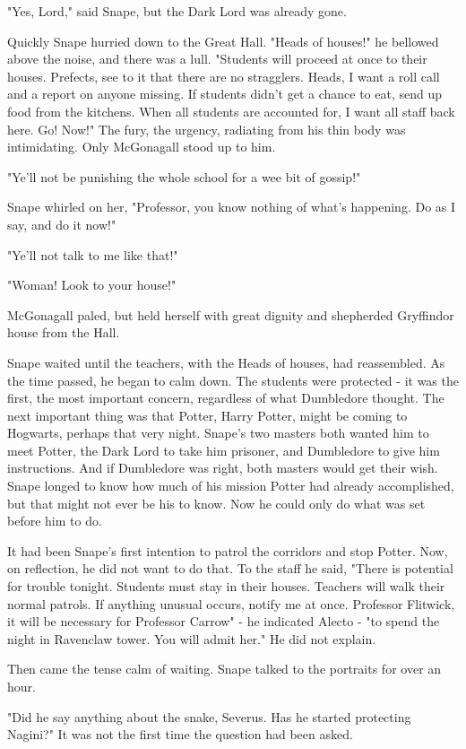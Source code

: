 "Yes, Lord," said Snape, but the Dark Lord was already gone.

Quickly Snape hurried down to the Great Hall. "Heads of houses!" he bellowed above the noise, and there was a lull. "Students will proceed at once to their houses. Prefects, see to it that there are no stragglers. Heads, I want a roll call and a report on anyone missing. If students didn't get a chance to eat, send up food from the kitchens. When all students are accounted for, I want all staff back here. Go! Now!" The fury, the urgency, radiating from his thin body was intimidating. Only McGonagall stood up to him.

"Ye'll not be punishing the whole school for a wee bit of gossip!"

Snape whirled on her, "Professor, you know nothing of what's happening. Do as I say, and do it now!"

"Ye'll not talk to me like that!"

"Woman! Look to your house!"

McGonagall paled, but held herself with great dignity and shepherded Gryffindor house from the Hall.

Snape waited until the teachers, with the Heads of houses, had reassembled. As the time passed, he began to calm down. The students were protected - it was the first, the most important concern, regardless of what Dumbledore thought. The next important thing was that Potter, Harry Potter, might be coming to Hogwarts, perhaps that very night. Snape's two masters both wanted him to meet Potter, the Dark Lord to take him prisoner, and Dumbledore to give him instructions. And if Dumbledore was right, both masters would get their wish. Snape longed to know how much of his mission Potter had already accomplished, but that might not ever be his to know. Now he could only do what was set before him to do.

It had been Snape's first intention to patrol the corridors and stop Potter. Now, on reflection, he did not want to do that. To the staff he said, "There is potential for trouble tonight. Students must stay in their houses. Teachers will walk their normal patrols. If anything unusual occurs, notify me at once. Professor Flitwick, it will be necessary for Professor Carrow" - he indicated Alecto - "to spend the night in Ravenclaw tower. You will admit her." He did not explain.

Then came the tense calm of waiting. Snape talked to the portraits for over an hour.

"Did he say anything about the snake, Severus. Has he started protecting Nagini?" It was not the first time the question had been asked.

